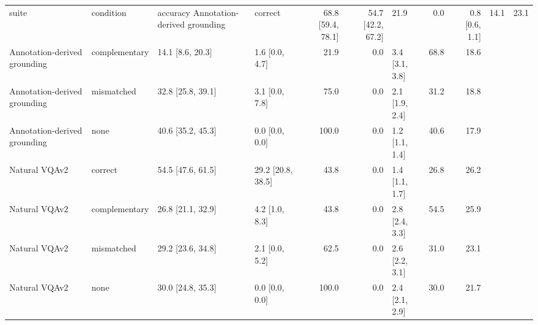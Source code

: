 \begin{tabular}{llllrrlrr}
\toprule
suite & condition & accuracy %
\midrule
Annotation-derived grounding & correct & 68.8 [59.4, 78.1] & 54.7 [42.2, 67.2] & 21.9 & 0.0 & 0.8 [0.6, 1.1] & 14.1 & 23.1 \\
Annotation-derived grounding & complementary & 14.1 [8.6, 20.3] & 1.6 [0.0, 4.7] & 21.9 & 0.0 & 3.4 [3.1, 3.8] & 68.8 & 18.6 \\
Annotation-derived grounding & mismatched & 32.8 [25.8, 39.1] & 3.1 [0.0, 7.8] & 75.0 & 0.0 & 2.1 [1.9, 2.4] & 31.2 & 18.8 \\
Annotation-derived grounding & none & 40.6 [35.2, 45.3] & 0.0 [0.0, 0.0] & 100.0 & 0.0 & 1.2 [1.1, 1.4] & 40.6 & 17.9 \\
Natural VQAv2 & correct & 54.5 [47.6, 61.5] & 29.2 [20.8, 38.5] & 43.8 & 0.0 & 1.4 [1.1, 1.7] & 26.8 & 26.2 \\
Natural VQAv2 & complementary & 26.8 [21.1, 32.9] & 4.2 [1.0, 8.3] & 43.8 & 0.0 & 2.8 [2.4, 3.3] & 54.5 & 25.9 \\
Natural VQAv2 & mismatched & 29.2 [23.6, 34.8] & 2.1 [0.0, 5.2] & 62.5 & 0.0 & 2.6 [2.2, 3.1] & 31.0 & 23.1 \\
Natural VQAv2 & none & 30.0 [24.8, 35.3] & 0.0 [0.0, 0.0] & 100.0 & 0.0 & 2.4 [2.1, 2.9] & 30.0 & 21.7 \\
\bottomrule
\end{tabular}
